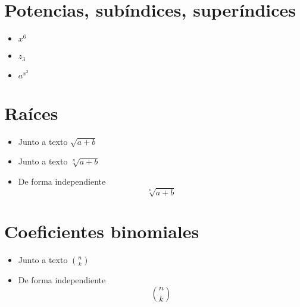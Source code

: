 \documentclass[12pt]{article}
\begin{document}
\section{Potencias, subíndices, superíndices}
\begin{itemize}
\item $ x^{6} $
\item $ z_{3} $
\item $ a^{x^{2}} $ 
\end{itemize}

\section{Raíces}
\begin{itemize}
\item Junto a texto $ \sqrt{a+b} $
\item Junto a texto $ \sqrt[n]{a+b} $
\item De forma independiente \[ \sqrt[n]{a+b} \]
\end{itemize}

\section{Coeficientes binomiales}
\begin{itemize}
\item Junto a texto $ \binom{n}{k} $
\item De forma independiente \[ \binom{n}{k} \]
\end{itemize}
\end{document}
